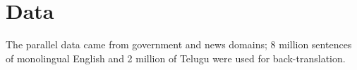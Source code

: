 \chapter{Data}
\label{app:a}

The parallel data came from government and news domains; 8 million sentences of monolingual
English and 2 million of Telugu were used for back-translation.
